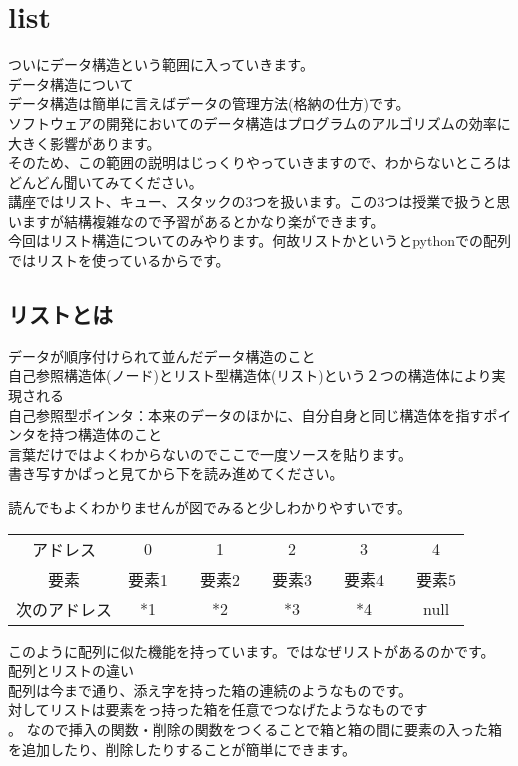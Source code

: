 \section{list}
ついにデータ構造という範囲に入っていきます。\\
データ構造について\\
データ構造は簡単に言えばデータの管理方法(格納の仕方)です。\\
ソフトウェアの開発においてのデータ構造はプログラムのアルゴリズムの効率に大きく影響があります。\\
そのため、この範囲の説明はじっくりやっていきますので、わからないところはどんどん聞いてみてください。\\
講座ではリスト、キュー、スタックの3つを扱います。この3つは授業で扱うと思いますが結構複雑なので予習があるとかなり楽ができます。\\
今回はリスト構造についてのみやります。何故リストかというとpythonでの配列ではリストを使っているからです。\\
\subsection{リストとは}
データが順序付けられて並んだデータ構造のこと\\
自己参照構造体(ノード)とリスト型構造体(リスト)という２つの構造体により実現される\\
自己参照型ポインタ：本来のデータのほかに、自分自身と同じ構造体を指すポインタを持つ構造体のこと\\
言葉だけではよくわからないのでここで一度ソースを貼ります。\\
書き写すかぱっと見てから下を読み進めてください。

読んでもよくわかりませんが図でみると少しわかりやすいです。
\begin{table}[htb]
\begin{center}
\begin{tabular}{|c|c|c|c|c|c|c|c|c|c|}
\cline{1-1}\cline{2-2}\cline{4-4}\cline{6-6}\cline{8-8}\cline{10-10}
アドレス & 0 && 1 && 2 && 3 && 4 \\ \cline{1-1}\cline{2-2}\cline{4-4}\cline{6-6}\cline{8-8}\cline{10-10}
要素 & 要素1 && 要素2 && 要素3 && 要素4 && 要素5\\ \cline{1-1}\cline{2-2}\cline{4-4}\cline{6-6}\cline{8-8}\cline{10-10}
次のアドレス & *1 && *2 && *3 && *4 && null   \\ 
\cline{1-1}\cline{2-2}\cline{4-4}\cline{6-6}\cline{8-8}\cline{10-10}
\end{tabular}
\end{center}
\end{table}
このように配列に似た機能を持っています。ではなぜリストがあるのかです。\\
配列とリストの違い\\
配列は今まで通り、添え字を持った箱の連続のようなものです。\\
対してリストは要素をっ持った箱を任意でつなげたようなものです\\。
なので挿入の関数・削除の関数をつくることで箱と箱の間に要素の入った箱を追加したり、削除したりすることが簡単にできます。\\

